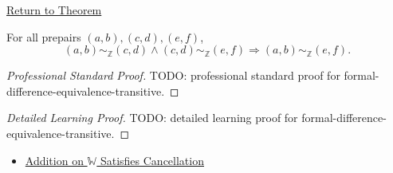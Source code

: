 \newpage
{}
\label{prf:formal-difference-equivalence-transitive}

\begin{remark*}[Return]
\hyperref[lem:formal-difference-equivalence-transitive]{Return to Theorem}
\end{remark*}

\begin{lemma*}
For all prepairs $(a,b),(c,d),(e,f)$,
\[
(a,b)\sim_{\mathbb{Z}}(c,d)\land
(c,d)\sim_{\mathbb{Z}}(e,f)
\Longrightarrow
(a,b)\sim_{\mathbb{Z}}(e,f).
\]
\end{lemma*}

\begin{proof}[Professional Standard Proof]
\LRAProofBodyStart
TODO: professional standard proof for formal-difference-equivalence-transitive.
\end{proof}

\begin{proof}[Detailed Learning Proof]
\LRAProofBodyStart
TODO: detailed learning proof for formal-difference-equivalence-transitive.
\end{proof}

\begin{remark*}
\end{remark*}

\begin{dependencies}
\begin{itemize}
  \item \hyperref[thm:addition-on-w-cancellation]{Addition on $\mathbb{W}$ Satisfies Cancellation}
\end{itemize}
\end{dependencies}

\clearpage
